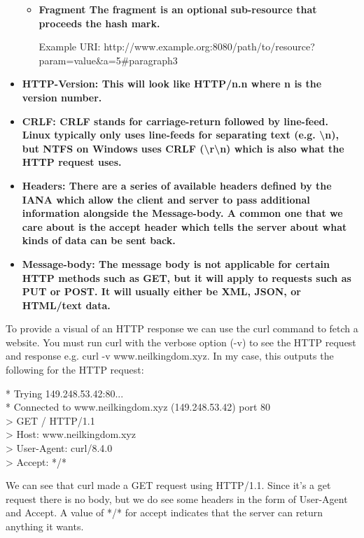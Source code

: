 \documentclass{article}
\begin{document}
\begin{itemize}
{\begin{itemize}
   \item{%
      \bfseries{Fragment} \mdseries The fragment is an optional sub-resource that proceeds the hash mark.
   }

   Example URI: http://www.example.org:8080/path/to/resource?param=value\&a=5\#paragraph3

   \end{itemize}
}

\item{%
   \bfseries{HTTP-Version:} \mdseries This will look like HTTP/n.n where n is the version number.
}

\item{%
   \bfseries{CRLF:} \mdseries CRLF stands for carriage-return followed by line-feed. Linux typically only uses 
   line-feeds for separating text (e.g. \textbackslash n), but NTFS on Windows uses CRLF 
   (\textbackslash r\textbackslash n) which is also what the HTTP request uses. 
}

\item{%
   \bfseries{Headers:} \mdseries There are a series of available headers defined by the IANA which allow the 
   client and server to pass additional information alongside the Message-body. A common one that we care 
   about is the accept header which tells the server about what kinds of data can be sent back. 
}

\item{%
   \bfseries{Message-body:} \mdseries The message body is not applicable for certain HTTP methods such as GET, 
   but it will apply to requests such as PUT or POST. It will usually either be XML, JSON, or HTML/text data. 
}

\end{itemize}

To provide a visual of an HTTP response we can use the curl command to fetch a website. You must run curl with 
the verbose option (-v) to see the HTTP request and response e.g. curl -v www.neilkingdom.xyz. In my case, 
this outputs the following for the HTTP request:

*   Trying 149.248.53.42:80...\\
* Connected to www.neilkingdom.xyz (149.248.53.42) port 80\\
> GET / HTTP/1.1\\
> Host: www.neilkingdom.xyz\\
> User-Agent: curl/8.4.0\\
> Accept: */*

We can see that curl made a GET request using HTTP/1.1. Since it's a get request there is no body, but we do 
see some headers in the form of User-Agent and Accept. A value of */* for accept indicates that the server can 
return anything it wants. 
\end{document}

